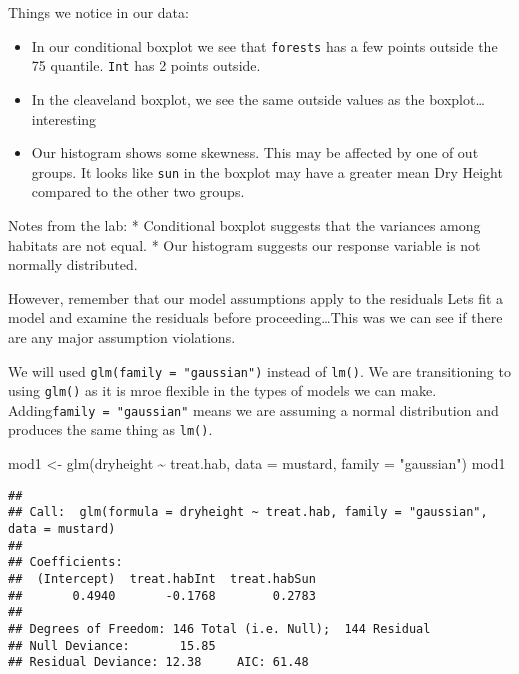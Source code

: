 \documentclass[
]{article}
\newenvironment{Shaded}{\begin{snugshade}}{\end{snugshade}}
\newcommand{\AttributeTok}[1]{\textcolor[rgb]{0.77,0.63,0.00}{#1}}
\newcommand{\FunctionTok}[1]{\textcolor[rgb]{0.00,0.00,0.00}{#1}}
\newcommand{\NormalTok}[1]{#1}
\newcommand{\OtherTok}[1]{\textcolor[rgb]{0.56,0.35,0.01}{#1}}
\newcommand{\SpecialCharTok}[1]{\textcolor[rgb]{0.00,0.00,0.00}{#1}}
\newcommand{\StringTok}[1]{\textcolor[rgb]{0.31,0.60,0.02}{#1}}
\providecommand{\tightlist}{%
  \setlength{\itemsep}{0pt}\setlength{\parskip}{0pt}}
\begin{document}
Things we notice in our data:

\begin{itemize}
\tightlist
\item
  In our conditional boxplot we see that \texttt{forests} has a few
  points outside the 75 quantile. \texttt{Int} has 2 points outside.
\item
  In the cleaveland boxplot, we see the same outside values as the
  boxplot\ldots{} interesting
\item
  Our histogram shows some skewness. This may be affected by one of out
  groups. It looks like \texttt{sun} in the boxplot may have a greater
  mean Dry Height compared to the other two groups.
\end{itemize}

Notes from the lab: * Conditional boxplot suggests that the variances
among habitats are not equal. * Our histogram suggests our response
variable is not normally distributed.

However, remember that our model assumptions apply to the residuals Lets
fit a model and examine the residuals before proceeding\ldots This was
we can see if there are any major assumption violations.

We will used \texttt{glm(family\ =\ "gaussian")} instead of
\texttt{lm()}. We are transitioning to using \texttt{glm()} as it is
mroe flexible in the types of models we can make.
Adding\texttt{family\ =\ "gaussian"} means we are assuming a normal
distribution and produces the same thing as \texttt{lm()}.

\begin{Shaded}
\begin{Highlighting}[]
\NormalTok{mod1 }\OtherTok{\textless{}{-}} \FunctionTok{glm}\NormalTok{(dryheight }\SpecialCharTok{\textasciitilde{}}\NormalTok{ treat.hab, }\AttributeTok{data =}\NormalTok{ mustard, }\AttributeTok{family =} \StringTok{"gaussian"}\NormalTok{)}
\NormalTok{mod1}
\end{Highlighting}
\end{Shaded}

\begin{verbatim}
## 
## Call:  glm(formula = dryheight ~ treat.hab, family = "gaussian", data = mustard)
## 
## Coefficients:
##  (Intercept)  treat.habInt  treat.habSun  
##       0.4940       -0.1768        0.2783  
## 
## Degrees of Freedom: 146 Total (i.e. Null);  144 Residual
## Null Deviance:       15.85 
## Residual Deviance: 12.38     AIC: 61.48
\end{verbatim}
\end{document}
